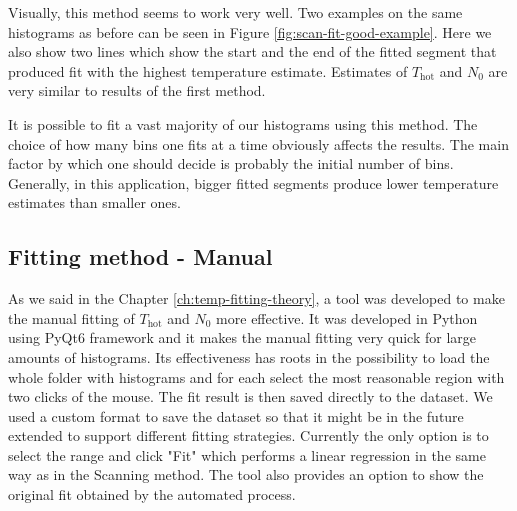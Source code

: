 Visually, this method seems to work very well. Two examples on the same histograms as before can be seen in Figure \ref{fig:scan-fit-good-example}. Here we also show two lines which show the start and the end of the fitted segment that produced fit with the highest temperature estimate. Estimates of $T_\mathrm{hot}$ and $N_0$ are very similar to results of the first method.

It is possible to fit a vast majority of our histograms using this method. The choice of how many bins one fits at a time obviously affects the results. The main factor by which one should decide is probably the initial number of bins. Generally, in this application, bigger fitted segments produce lower temperature estimates than smaller ones.

\subsection*{Fitting method - Manual}
As we said in the Chapter \ref{ch:temp-fitting-theory}, a tool was developed to make the manual fitting of $T_{\mathrm{hot}}$ and $N_0$ more effective. It was developed in Python using PyQt6 framework and it makes the manual fitting very quick for large amounts of histograms. Its effectiveness has roots in the possibility to load the whole folder with histograms and for each select the most reasonable region with two clicks of the mouse. The fit result is then saved directly to the dataset. We used a custom format to save the dataset so that it might be in the future extended to support different fitting strategies. Currently the only option is to select the range and click "Fit" which performs a linear regression in the same way as in the Scanning method. The tool also provides an option to show the original fit obtained by the automated process. 


